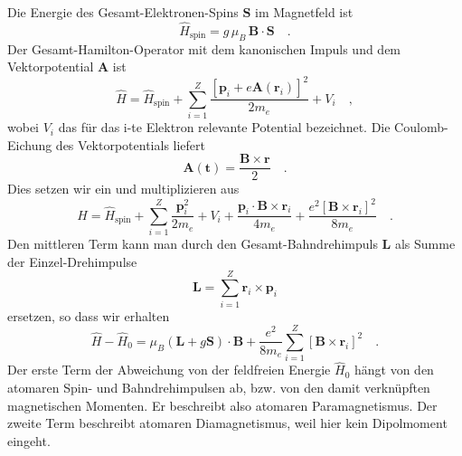 Die Energie des Gesamt-Elektronen-Spins $\bm{S}$  im Magnetfeld ist
\begin{equation}
    \hat{H}_\text{spin} = g \, \mu_B \, \bm{B} \cdot \bm{S} \quad .
\end{equation}
Der Gesamt-Hamilton-Operator  mit dem kanonischen Impuls und dem Vektorpotential $\bm{A}$ ist
\begin{equation}
    \hat{H} = \hat{H}_\text{spin} + \sum_{i=1}^Z \frac{ 
        \left[ \bm{p}_i + e \bm{A}(\bm{r}_i) \right]^2}{2 m_e} + V_i \quad ,
\end{equation}
wobei $V_i$ das für das i-te Elektron relevante Potential bezeichnet. Die Coulomb-Eichung des Vektorpotentials liefert
\begin{equation}
    \bm{A}(\bm{t}) = \frac{\bm{B} \times \bm{r}}{2} \quad .
\end{equation}
Dies setzen wir ein und multiplizieren aus
\begin{equation}
    \hat{H} = \hat{H}_\text{spin} + \sum_{i=1}^Z
    \frac{ \bm{p}_i^2}{2 m_e} + V_i
+   \frac{ \bm{p}_i  \cdot \bm{B} \times \bm{r}_i}{4 m_e}
+    \frac{e^2 \left[\bm{B} \times \bm{r}_i \right]^2}{8 m_e}  \quad .
\end{equation}
Den mittleren Term kann man durch den  Gesamt-Bahndrehimpuls $\bm{L}$ als  Summe der Einzel-Drehimpulse
\begin{equation}
    \bm{L} = \sum_{i=1}^Z \bm{r}_i \times \bm{p}_i
 \end{equation}
 ersetzen, so dass wir erhalten
 \begin{equation}
    \hat{H} - \hat{H}_0 = 
    \mu_B (\bm{L} + g\bm{S}) \cdot \bm{B}
    + \frac{e^2}{8 m_e} 
     \sum_{i=1}^Z  \left[\bm{B} \times \bm{r}_i \right]^2 \quad . \label{eq:7_H_atom_para_dia}
\end{equation}
Der erste Term der Abweichung von der feldfreien Energie $\hat{H}_0$ hängt von den atomaren Spin- und Bahndrehimpulsen ab, bzw. von den damit verknüpften magnetischen Momenten. Er beschreibt also atomaren Paramagnetismus. Der zweite Term beschreibt atomaren Diamagnetismus, weil hier kein Dipolmoment eingeht.

